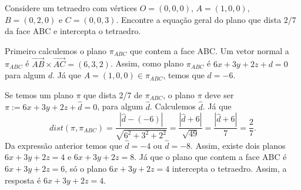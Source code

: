 \documentclass[11pt]{exam}
\begin{document}
\begin{questions}
 \question[10] Considere um tetraedro com vértices 
 $O=(0,0,0)$, $A=(1,0,0)$, $B=(0,2,0)$ e $C=(0,0,3)$.
 Encontre a equação geral do plano que dista $2/7$ 
 da face ABC e intercepta o tetraedro.
   \begin{solution}
   Primeiro calculemos o plano $\pi_{ABC}$ que contem a face ABC.
   Um vetor normal a $\pi_{ABC}$ é $\overrightarrow{AB} \times \overrightarrow{AC}=(6,3,2)$.
   Assim, como plano  $\pi_{ABC}$ é $6x+3y+2z+d=0$ para algum $d$. 
   Já que $A=(1,0,0) \in \pi_{ABC}$, temos que $d=-6$.
   
   Se temos um plano $\pi$ que dista 2/7 de $\pi_{ABC}$, 
   o plano $\pi$ deve ser $\pi:=6x+3y+2z+\widehat{d}=0$, 
   para algum $\widehat{d}$. Calculemos $\widehat{d}$. 
   Já que 
   $$dist(\pi,\pi_{ABC})=
   \frac{|\widehat{d}-(-6)|}{\sqrt{6^2+3^{2}+2^2}}=
   \frac{|\widehat{d}+6|}{\sqrt{49}}=
   \frac{|\widehat{d}+6|}{7}=\frac{2}{7}.$$
   Da expressão anterior temos que $\widehat{d}=-4$ ou 
   $\widehat{d}=-8$. Assim, existe dois planos 
   $6x+3y+2z=4$
   e 
   $6x+3y+2z=8$. Já que 
   o plano que contem a face ABC é 
    $6x+3y+2z=6$, só o plano $6x+3y+2z=4$ intercepta o tetraedro.
   Assim, a resposta é  $6x+3y+2z=4$.
   \end{solution}
 \end{questions}
\end{document}
